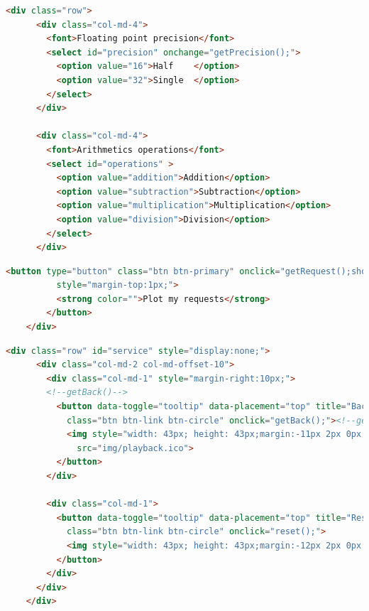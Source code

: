 \documentclass[11pt]{article}
\begin{document}
\begin{lstlisting}[label={lst:Select option}, language=HTML, caption={Select option for precisions and arithmetic operations},]
	<div class="row">
      <div class="col-md-4">
        <font>Floating point precision</font>
        <select id="precision" onchange="getPrecision();">      
          <option value="16">Half    </option>
          <option value="32">Single  </option>
        </select>
      </div>

      <div class="col-md-4">
        <font>Arithmetics operations</font>
        <select id="operations" > 
          <option value="addition">Addition</option>
          <option value="subtraction">Subtraction</option>
          <option value="multiplication">Multiplication</option>
          <option value="division">Division</option>
        </select>
      </div>
\end{lstlisting}


\begin{lstlisting}[label={lst:Plot my requests}, language=HTML, caption={Plot my requests button to get the value of the select option},]
        <button type="button" class="btn btn-primary" onclick="getRequest();showService();" 
          style="margin-top:1px;">
          <strong color="">Plot my requests</strong>
        </button>
	</div>      
\end{lstlisting}

\begin{lstlisting}[label={lst:select option button}, language=html, caption={Back and Reset buttons},]
    <div class="row" id="service" style="display:none;">
      <div class="col-md-2 col-md-offset-10">
        <div class="col-md-1" style="margin-right:10px;">
        <!--getBack()-->
          <button data-toggle="tooltip" data-placement="top" title="Back" type="button" 
            class="btn btn-link btn-circle" onclick="getBack();"><!--getBack-->
            <img style="width: 43px; height: 43px;margin:-11px 2px 0px -6px;" 
              src="img/playback.ico">
          </button>
        </div>

        <div class="col-md-1">
          <button data-toggle="tooltip" data-placement="top" title="Reset" type="button" 
            class="btn btn-link btn-circle" onclick="reset();">
            <img style="width: 43px; height: 43px;margin:-12px 2px 0px -7px;" src="img/reset.ico">
          </button>
        </div>
      </div>
    </div>
\end{lstlisting}
\end{document}
